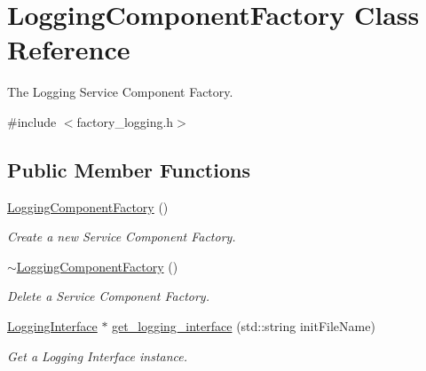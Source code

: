 \hypertarget{classLoggingComponentFactory}{}\section{Logging\+Component\+Factory Class Reference}
\label{classLoggingComponentFactory}


The Logging Service Component Factory.  




{\ttfamily \#include $<$factory\+\_\+logging.\+h$>$}

\subsection*{Public Member Functions}
\begin{DoxyCompactItemize}
\item 
\hyperlink{classLoggingComponentFactory_a0792b093f678c8e6184834a57ee90057}{Logging\+Component\+Factory} ()\hypertarget{classLoggingComponentFactory_a0792b093f678c8e6184834a57ee90057}{}\label{classLoggingComponentFactory_a0792b093f678c8e6184834a57ee90057}

\begin{DoxyCompactList}\small\item\em Create a new Service Component Factory. \end{DoxyCompactList}\item 
\hyperlink{classLoggingComponentFactory_a2fe80510243ff2d5720bf3e4b01d529d}{$\sim$\+Logging\+Component\+Factory} ()\hypertarget{classLoggingComponentFactory_a2fe80510243ff2d5720bf3e4b01d529d}{}\label{classLoggingComponentFactory_a2fe80510243ff2d5720bf3e4b01d529d}

\begin{DoxyCompactList}\small\item\em Delete a Service Component Factory. \end{DoxyCompactList}\item 
\hyperlink{classLoggingInterface}{Logging\+Interface} $\ast$ \hyperlink{classLoggingComponentFactory_a62741318ee4ec84313990989689fc2f0}{get\+\_\+logging\+\_\+interface} (std\+::string init\+File\+Name)\hypertarget{classLoggingComponentFactory_a62741318ee4ec84313990989689fc2f0}{}\label{classLoggingComponentFactory_a62741318ee4ec84313990989689fc2f0}

\begin{DoxyCompactList}\small\item\em Get a Logging Interface instance. \end{DoxyCompactList}\end{DoxyCompactItemize}


